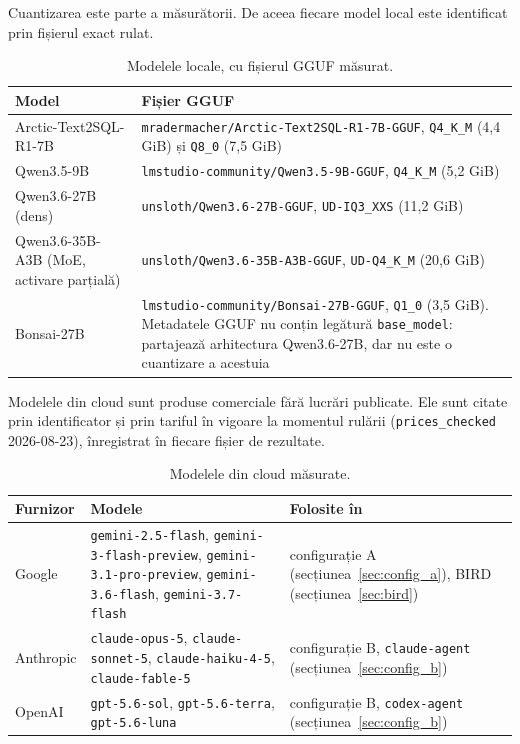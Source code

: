 \documentclass[12pt,a4paper]{report}
\newcommand{\hd}[1]{\textbf{#1}}
\newcommand{\code}[1]{\texttt{\small #1}}
\begin{document}
Cuantizarea este parte a măsurătorii.
De aceea fiecare model local este identificat prin fișierul
exact rulat.

\begin{table}[H]
\centering
\footnotesize
\caption{Modelele locale, cu fișierul GGUF măsurat.}
\begin{tabularx}{\textwidth}{@{}p{4.3cm} L@{}}
\toprule
\hd{Model} & \hd{Fișier GGUF} \\
\midrule
Arctic-Text2SQL-R1-7B \cite{arctic} &
\code{mradermacher/Arctic-Text2SQL-R1-7B-GGUF}, \code{Q4\_K\_M} (4,4 GiB) și
\code{Q8\_0} (7,5 GiB) \\
Qwen3.5-9B \cite{qwen} &
\code{lmstudio-community/Qwen3.5-9B-GGUF}, \code{Q4\_K\_M} (5,2 GiB) \\
Qwen3.6-27B (dens) &
\code{unsloth/Qwen3.6-27B-GGUF}, \code{UD-IQ3\_XXS} (11,2 GiB) \\
Qwen3.6-35B-A3B (MoE, activare parțială) &
\code{unsloth/Qwen3.6-35B-A3B-GGUF}, \code{UD-Q4\_K\_M} (20,6 GiB) \\
Bonsai-27B &
\code{lmstudio-community/Bonsai-27B-GGUF}, \code{Q1\_0} (3,5 GiB). Metadatele
GGUF nu conțin legătură \code{base\_model}: partajează arhitectura
Qwen3.6-27B, dar nu este o cuantizare a acestuia \\
\bottomrule
\end{tabularx}
\end{table}

Modelele din cloud sunt produse comerciale fără lucrări publicate. Ele sunt
citate prin identificator și prin tariful în vigoare la momentul rulării
(\code{prices\_checked} 2026-08-23), înregistrat în fiecare fișier de
rezultate.

\begin{table}[H]
\centering
\footnotesize
\caption{Modelele din cloud măsurate.}
\begin{tabularx}{\textwidth}{@{}p{2.0cm} L p{2.5cm}@{}}
\toprule
\hd{Furnizor} & \hd{Modele} & \hd{Folosite în} \\
\midrule
Google &
\code{gemini-2.5-flash}, \code{gemini-3-flash-preview},
\code{gemini-3.1-pro-preview}, \code{gemini-3.6-flash},
\code{gemini-3.7-flash} & configurație A (secțiunea~\ref{sec:config_a}), BIRD (secțiunea~\ref{sec:bird}) \\
Anthropic &
\code{claude-opus-5}, \code{claude-sonnet-5}, \code{claude-haiku-4-5},
\code{claude-fable-5} & configurație B, \code{claude-agent} (secțiunea~\ref{sec:config_b}) \\
OpenAI &
\code{gpt-5.6-sol}, \code{gpt-5.6-terra}, \code{gpt-5.6-luna} &
configurație B, \code{codex-agent} (secțiunea~\ref{sec:config_b}) \\
\bottomrule
\end{tabularx}
\end{table}
\end{document}
